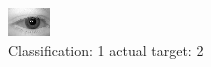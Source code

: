 \begin{figure}[h!]
\begin{center}
\includegraphics[width=0.60\columnwidth]{figures/ID365_class_1_target_2.png}
\end{center}
\caption{ Classification: 1 actual target: 2}
\label{fig:ID365_class_1_target_2}
\end{figure}
